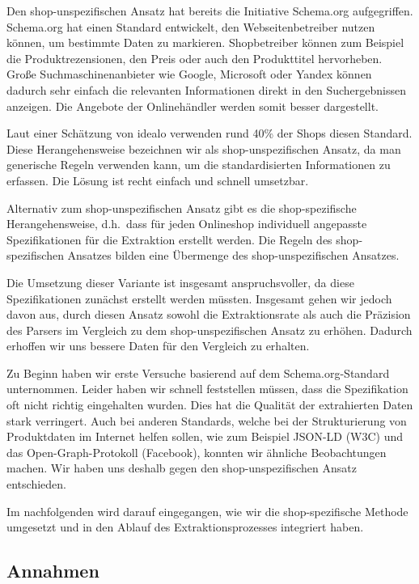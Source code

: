Den shop-unspezifischen Ansatz hat bereits die Initiative Schema.org aufgegriffen.
Schema.org hat einen Standard entwickelt, den Webseitenbetreiber nutzen können, um bestimmte
Daten zu markieren.
Shopbetreiber können zum Beispiel die Produktrezensionen, den Preis oder auch den Produkttitel hervorheben.
Große Suchmaschinenanbieter wie Google, Microsoft oder Yandex können dadurch sehr einfach die relevanten Informationen
direkt in den Suchergebnissen anzeigen.
Die Angebote der Onlinehändler werden somit besser dargestellt.

Laut einer Schätzung von idealo verwenden rund 40\% der Shops diesen Standard.
Diese Herangehensweise bezeichnen wir als shop-unspezifischen Ansatz, da man generische Regeln verwenden kann,
um die standardisierten Informationen zu erfassen.
Die Lösung ist recht einfach und schnell umsetzbar.

Alternativ zum shop-unspezifischen Ansatz gibt es die shop-spezifische Herangehensweise, d.h.\ dass für jeden
Onlineshop individuell angepasste Spezifikationen für die Extraktion erstellt werden.
Die Regeln des shop-spezifischen Ansatzes bilden eine Übermenge des shop-unspezifischen Ansatzes.

Die Umsetzung dieser Variante ist insgesamt anspruchsvoller, da diese Spezifikationen zunächst erstellt werden müssten.
Insgesamt gehen wir jedoch davon aus, durch diesen Ansatz sowohl die Extraktionsrate als auch die Präzision des Parsers
im Vergleich zu dem shop-unspezifischen Ansatz zu erhöhen.
Dadurch erhoffen wir uns bessere Daten für den Vergleich zu erhalten.

Zu Beginn haben wir erste Versuche basierend auf dem Schema.org-Standard unternommen.
Leider haben wir schnell feststellen müssen, dass die Spezifikation oft nicht richtig eingehalten wurden.
Dies hat die Qualität der extrahierten Daten stark verringert.
Auch bei anderen Standards, welche bei der Strukturierung von Produktdaten im Internet helfen sollen, wie zum Beispiel
JSON-LD (W3C) und das Open-Graph-Protokoll (Facebook), konnten wir ähnliche Beobachtungen machen.
Wir haben uns deshalb gegen den shop-unspezifischen Ansatz entschieden.

Im nachfolgenden wird darauf eingegangen, wie wir die shop-spezifische Methode umgesetzt und in den Ablauf des
Extraktionsprozesses integriert haben.

\subsection{Annahmen}
\label{subsec:annahmen}

